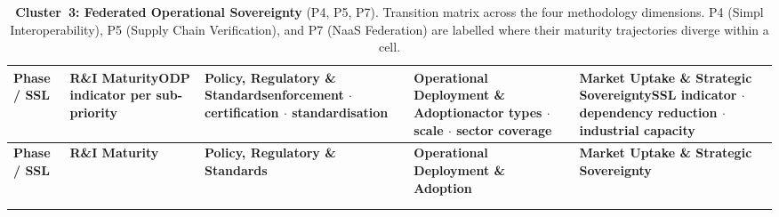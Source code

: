 \begin{landscape}
\setlength{\textwidth}{26.5cm}\setlength{\linewidth}{26.5cm}%
\setlength{\hsize}{26.5cm}\setlength{\columnwidth}{26.5cm}
\setlength{\tabcolsep}{5pt}
\renewcommand{\arraystretch}{1.35}

\begin{longtable}{%
|>{\footnotesize\raggedright\arraybackslash}p{2.8cm}%
|>{\footnotesize\raggedright\arraybackslash}p{5.4cm}%
|>{\footnotesize\raggedright\arraybackslash}p{5.4cm}%
|>{\footnotesize\raggedright\arraybackslash}p{5.4cm}%
|>{\footnotesize\raggedright\arraybackslash}p{5.4cm}|}

\caption{\textbf{Cluster~3: Federated Operational Sovereignty} (P4, P5, P7).
Transition matrix across the four methodology dimensions. P4 (Simpl
Interoperability), P5 (Supply Chain Verification), and P7 (NaaS Federation)
are labelled where their maturity trajectories diverge within a cell.}
\label{tab:cluster3}\\

\hline
\rowcolor{colheader}
\textbf{Phase / SSL} &
\textbf{R\&I Maturity}{\scriptsize ODP indicator per sub-priority} &
\textbf{Policy, Regulatory \& Standards}{\scriptsize enforcement $\cdot$
  certification $\cdot$ standardisation} &
\textbf{Operational Deployment \& Adoption}{\scriptsize actor types $\cdot$
  scale $\cdot$ sector coverage} &
\textbf{Market Uptake \& Strategic Sovereignty}{\scriptsize SSL indicator
  $\cdot$ dependency reduction $\cdot$ industrial capacity} \\
\hline
\endfirsthead

\hline
\rowcolor{colheader}
\textbf{Phase / SSL} &
\textbf{R\&I Maturity} &
\textbf{Policy, Regulatory \& Standards} &
\textbf{Operational Deployment \& Adoption} &
\textbf{Market Uptake \& Strategic Sovereignty} \\
\hline
\endhead
\hline\multicolumn{5}{r}{\footnotesize\textit{Continued\ldots}}\\ \endfoot
\hline \endlastfoot


\end{longtable}
\end{landscape}
